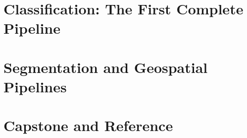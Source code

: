 \documentclass[11pt,openany]{book}
\theoremstyle{definition}
\begin{document}
\part{Classification: The First Complete Pipeline}





\part{Segmentation and Geospatial Pipelines}





\part{Capstone and Reference}


\appendix


\end{document}
